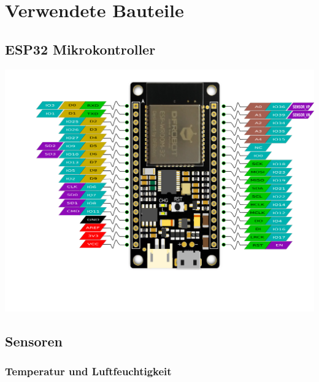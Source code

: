 \documentclass[
  12pt, %
  a4paper, %
  twoside, %
  openany, %
  numbers=noenddot, %
  BCOR=5mm, %
  parskip=half*, %
  thesis, %
]{bfhbook}
\begin{document}
\chapter{Verwendete Bauteile}
\section{ESP32 Mikrokontroller}
\begin{center}
    \includegraphics[width=14cm, left]{Bilder/FireBeetleBoard.png}
    \captionsetup{justification=raggedright}
\end{center}
 \section{Sensoren}
 \subsection{Temperatur und Luftfeuchtigkeit}
\end{document}
